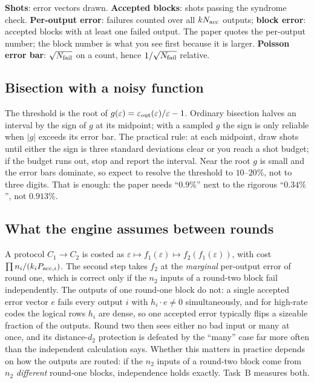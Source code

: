 \documentclass[11pt]{article}
\newcommand{\eps}{\varepsilon}
\begin{document}
\begin{vocab}
\textbf{Shots}: error vectors drawn. \textbf{Accepted blocks}: shots passing the
syndrome check. \textbf{Per-output error}: failures counted over all $k N_{\rm acc}$
outputs; \textbf{block error}: accepted blocks with at least one failed output. The
paper quotes the per-output number; the block number is what you see first because it
is larger. \textbf{Poisson error bar}: $\sqrt{N_{\rm fail}}$ on a count, hence
$1/\sqrt{N_{\rm fail}}$ relative.
\end{vocab}

\subsection{Bisection with a noisy function}

The threshold is the root of $g(\eps) = \eps_{\rm out}(\eps)/\eps - 1$. Ordinary
bisection halves an interval by the sign of $g$ at its midpoint; with a sampled $g$
the sign is only reliable when $|g|$ exceeds its error bar. The practical rule: at
each midpoint, draw shots until either the sign is three standard deviations clear or
you reach a shot budget; if the budget runs out, stop and report the interval. Near
the root $g$ is small and the error bars dominate, so expect to resolve the threshold
to $10$--$20\%$, not to three digits. That is enough: the paper needs ``$0.9\%$'' next
to the rigorous ``$0.34\%$'', not $0.913\%$.

\subsection{What the engine assumes between rounds}

A protocol $C_1\to C_2$ is costed as $\eps\mapsto f_1(\eps)\mapsto f_2(f_1(\eps))$,
with cost $\prod n_i/(k_i P_{{\rm acc},i})$. The second step takes $f_2$ at the
\emph{marginal} per-output error of round one, which is correct only if the $n_2$
inputs of a round-two block fail independently. The outputs of one round-one block
do not: a single accepted error vector $e$ fails every output $i$ with
$h_i\cdot e\ne0$ simultaneously, and for high-rate codes the logical rows $h_i$ are
dense, so one accepted error typically flips a sizeable fraction of the outputs.
Round two then sees either no bad input or many at once, and its distance-$d_2$
protection is defeated by the ``many'' case far more often than the independent
calculation says. Whether this matters in practice depends on how the outputs are
routed: if the $n_2$ inputs of a round-two block come from $n_2$ \emph{different}
round-one blocks, independence holds exactly. Task~B measures both.
\end{document}
